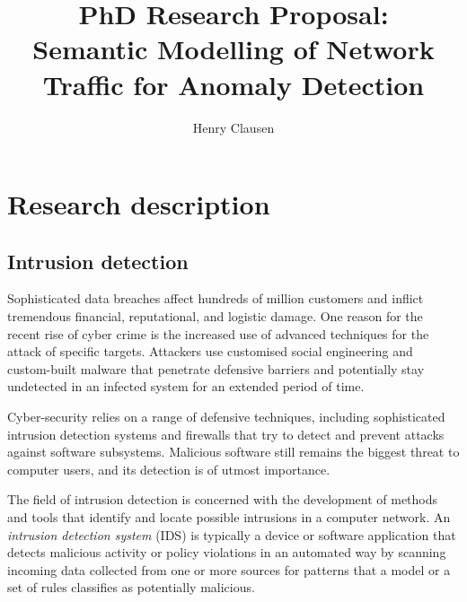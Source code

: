 \documentclass[a4paper,12pt,twoside]{report}
\makeatletter
\newcommand*{\toccontents}{\@starttoc{toc}}
\makeatother
\begin{document}
\title{\LARGE {\bf PhD Research Proposal:\\Semantic Modelling of Network Traffic for Anomaly Detection}\\
 \vspace*{-5mm}
}
\author{Henry Clausen}

\maketitle



\toccontents



\chapter{Research description}


\section{Intrusion detection}

Sophisticated data breaches affect hundreds of million customers and inflict tremendous financial, reputational, and logistic damage. One reason for the recent rise of cyber crime is the increased use of advanced techniques for the attack of specific targets. Attackers use customised social engineering and custom-built malware that penetrate defensive barriers and potentially stay undetected in an infected system for an extended period of time. 

Cyber-security relies on a range of defensive techniques, including sophisticated intrusion detection systems and firewalls that try to detect and prevent attacks against software subsystems. Malicious software still remains the biggest threat to computer users, and its detection is of utmost importance. 

The field of intrusion detection is concerned with the development of methods and tools that identify and locate possible intrusions in a computer network. An \textit{intrusion detection system} (IDS) is typically a device or software application that detects malicious activity or policy violations in an automated way by scanning incoming data collected from one or more sources for patterns that a model or a set of rules classifies as potentially malicious.
\end{document}
